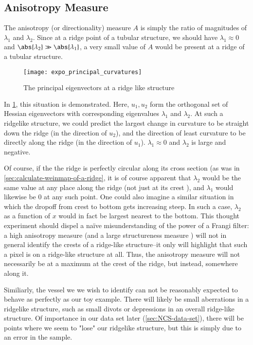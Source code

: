 \subsection{Anisotropy Measure} \label{sec:frangi.anisotropy}
The anisotropy (or directionality) measure $A$ is simply the ratio of magnitudes of $\lambda_1$ and $\lambda_2$. Since at a ridge point of a tubular structure, we should have $\lambda_1 \approx 0$ and $\abs{\lambda_2} \gg \abs{\lambda_1}$,
a very small value of $A$ would be present at a ridge of a tubular structure.

\begin{figure} \centering
  \texttt{[image: expo\_principal\_curvatures]}
  \caption{The principal eigenvectors at a ridge like structure} 
  \label{fig:expo-principal-curvatures}
\end{figure}

In \cref{fig:expo-principal-curvatures}, this situation is demonstrated. Here, $u_1, u_2$ form the orthogonal set of Hessian eigenvectors with corresponding eigenvalues $\lambda_1$ and $\lambda_2$. At such a ridgelike structure, we could predict the largest change in curvature to be straight down the ridge (in the direction of $u_2$), and the direction of least curvature to be directly along the ridge (in the direction  of $u_1$). $\lambda_1 \approx 0$ and $\lambda_2$ is large and negative.

Of course, if the the ridge is perfectly circular along its cross section (as was in \cref{sec:calculate-weinmap-of-a-ridge}, it is of course apparent that $\lambda_2$ would be the same value at any place along the ridge (not just at its crest ), and $\lambda_1$ would likewise be 0 at any such point.  One could also imagine a similar situation in which the dropoff from crest to bottom gets increasing steep. In such a case, $\lambda_2$ as a function of $x$ would in fact be largest nearest to the bottom. This thought experiment should dispel a na\"{i}ve misunderstanding of the power of a Frangi filter: a high anisotropy measure (and a large structureness measure ) will not in general identify the crests of a ridge-like structure--it only will highlight that such a pixel is on a ridge-like structure at all. Thus, the anisotropy measure will not necessarily be at a maximum at the crest of the ridge, but instead, somewhere along it.

Similiarly, the vessel we we wish to identify can not be reasonably expected to behave as perfectly as our toy example. There will likely be small aberrations in a ridgelike structure, such as small divots or depressions in an overall ridge-like structure. Of importance in our data set later (\cref{sec:NCS-data-set}), there will be points where we seem to "lose" our ridgelike structure,
but this is simply due to an error in the sample.

